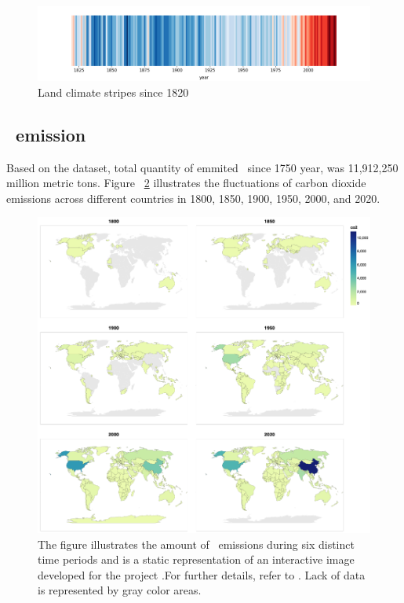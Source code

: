 \begin{figure}[h]
  \includegraphics[width=\linewidth]{img/climate_stripes.png}
  \caption{Land climate stripes since 1820}
  \label{fig:climat_stripes}
\end{figure}

\subsection{\coo\ emission}

Based on the dataset, total quantity of emmited \coo\ since 1750 year, was 11,912,250 million metric tons. 
Figure ~\ref{fig:co2_emission_global} illustrates the fluctuations of carbon dioxide emissions across different countries in 1800, 1850, 1900, 1950, 2000, and 2020.
\begin{figure}[h]
  \includegraphics[width=\linewidth]{img/co2emission.png}
  \caption{The figure illustrates the amount of \coo\ emissions during six distinct time periods and is a static representation of an interactive image developed for the project .For further details, refer to \cite{github}. Lack of data is represented by gray color areas.} 
  \label{fig:co2_emission_global}
\end{figure}

